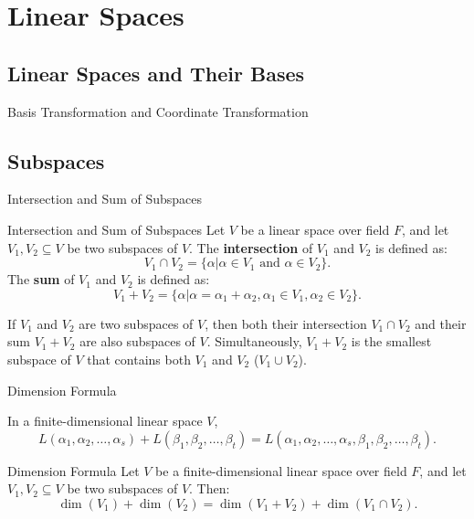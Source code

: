 \documentclass[11pt]{../../TexTemplate/elegantbook} %
\begin{document}
\chapter{Linear Spaces}
\section{Linear Spaces and Their Bases}

\begin{leftbarTitle}{Basis Transformation and Coordinate Transformation}\end{leftbarTitle}


\section{Subspaces}
\begin{leftbarTitle}{Intersection and Sum of Subspaces}\end{leftbarTitle}
\begin{definition}{Intersection and Sum of Subspaces}
    Let \( V \) be a linear space over field \( F \), 
    and let \( V_1, V_2 \subseteq V \) be two subspaces of \( V \).
    The \textbf{intersection} of \( V_1 \) and \( V_2 \) is defined as:
    \[
    V_1 \cap V_2 = \{ \alpha | \alpha \in V_1 \text{ and } \alpha \in V_2 \}.
    \]
    The \textbf{sum} of \( V_1 \) and \( V_2 \) is defined as:
    \[
    V_1 + V_2 = \{ \alpha | \alpha = \alpha_1 + \alpha_2, 
    \alpha_1 \in V_1, \alpha_2 \in V_2 \}.
    \]
\end{definition}

If \( V_1 \) and \( V_2 \) are two subspaces of \( V \), 
then both their intersection \( V_1 \cap V_2 \) and their sum \( V_1 + V_2 \) are also subspaces of \( V \).
Simultaneously, \( V_{1}+V_{2} \) is the smallest subspace of \( V \) 
that contains both \( V_1 \) and \( V_2 \) (\(V_{1}\cup V_{2}\)).

\begin{leftbarTitle}{Dimension Formula}\end{leftbarTitle}
\begin{proposition}
    In a finite-dimensional linear space \( V \),
    \[
    L(\alpha_1, \alpha_2, \dots, \alpha_s) + L(\beta_1, \beta_2, \dots, \beta_t) = 
    L(\alpha_1, \alpha_2, \dots, \alpha_s, \beta_1, \beta_2, \dots, \beta_t).
    \]
\end{proposition}

\begin{theorem}{Dimension Formula}
    Let \( V \) be a finite-dimensional linear space over field \( F \), 
    and let \( V_1, V_2 \subseteq V \) be two subspaces of \( V \). Then:
    \[
    \dim(V_1) + \dim(V_2) = \dim(V_1 + V_2) + \dim(V_1 \cap V_2).
    \]
    
\end{theorem}
\end{document}
